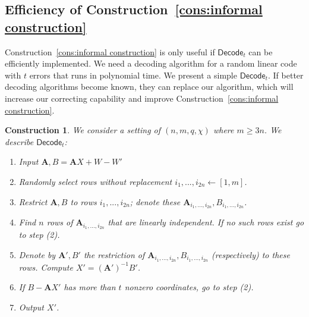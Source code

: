 \documentclass[11pt]{article}
\newcommand{\consref}[1]{\mbox{Construction~\ref{#1}}}
\newcommand{\class}[1]{{\ensuremath{\mathsf{#1}}}}
\newcommand{\rep}{\ensuremath{\class{Rep}}\xspace}
\newcommand{\vect}[1]{\ensuremath{\textbf{#1}}}
\newcommand{\Fq}{\ensuremath{\mathbb{F}_q}}
\newcommand{\sample}{\ensuremath{\class{Sample}}\xspace}
\newcommand{\decode}{\ensuremath{\mathsf{Decode}}}
\newtheorem{construction}[theorem]{Construction}
\newcommand{\vA}{\vect{A}}
\begin{document}

\subsection{Efficiency of \consref{cons:informal construction}}
\label{sec:time main construction}
\consref{cons:informal construction} is only useful if $\decode_t$ can be efficiently implemented.  We need a decoding algorithm for a random linear code with $t$ errors that runs in polynomial time.  We present a simple $\decode_t$.  If better decoding algorithms become known, they can replace our algorithm, which will increase our correcting capability and improve \consref{cons:informal construction}.

\newpage
\begin{construction}
\label{cons:decoding algorithm} We consider a setting of $(n, m, q, \chi)$ where $m\geq 3n$.  We describe $\decode_t$:
\begin{enumerate}
\item Input $\vA , B = \vA X + W - W'$
\item Randomly select rows without replacement $i_1,..., i_{2n}\leftarrow [1,m]$.  
\item Restrict $\vA, B$ to rows $i_1,...,i_{2n}$; denote these $\vA_{i_1,...,i_{2n}}, B_{i_1,...,i_{2n}}$.
\item Find $n$ rows of $\vA_{i_1,..., i_{2n}}$ that are linearly independent.  
If no such rows exist go to step (2).
\item Denote by $\vA', B'$ the restriction of $\vA_{i_1,..., i_{2n}}, B_{i_1,..., i_{2n}}$ (respectively) to these rows. Compute $X' = (\vA')^{-1}B'$.  
\item If $B- \vA X'$ has more than $t$ nonzero coordinates, go to step (2).
\item Output $X'$.
\end{enumerate}
\end{construction}
\end{document}
